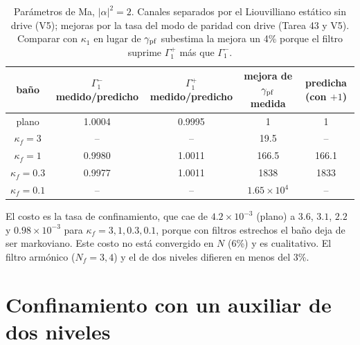 \documentclass[11pt]{report}
\begin{document}
\begin{table}[h]
\centering
\begin{tabular}{ccccc}
\toprule
baño & $\Gamma_{1}^{-}$ medido/predicho & $\Gamma_{1}^{+}$ medido/predicho & mejora de $\gamma_{\rm pf}$ medida & predicha (con $+1$)\\
\midrule
plano & 1.0004 & 0.9995 & 1 & 1\\
$\kappa_{f}=3$ & -- & -- & 19.5 & --\\
$\kappa_{f}=1$ & 0.9980 & 1.0011 & 166.5 & 166.1\\
$\kappa_{f}=0.3$ & 0.9977 & 1.0011 & 1838 & 1833\\
$\kappa_{f}=0.1$ & -- & -- & $1.65\times10^{4}$ & --\\
\bottomrule
\end{tabular}
\caption{Par\'ametros de Ma, $|\alpha|^{2}=2$. Canales separados por el Liouvilliano est\'atico sin drive (V5); mejoras por la tasa del modo de paridad con drive (Tarea 43 y V5). Comparar con $\kappa_{1}$ en lugar de $\gamma_{\rm pf}$ subestima la mejora un 4\% porque el filtro suprime $\Gamma_{1}^{+}$ m\'as que $\Gamma_{1}^{-}$.}
\end{table}

\begin{center}
\end{center}

El costo es la tasa de confinamiento, que cae de $4.2\times10^{-3}$ (plano) a $3.6$, $3.1$, $2.2$ y $0.98\times10^{-3}$ para $\kappa_{f}=3,1,0.3,0.1$, porque con filtros estrechos el baño deja de ser markoviano. Este costo no est\'a convergido en $N$ (6\%) y es cualitativo. El filtro arm\'onico ($N_{f}=3,4$) y el de dos niveles difieren en menos del 3\%.

\section{Confinamiento con un auxiliar de dos niveles}
\end{document}

